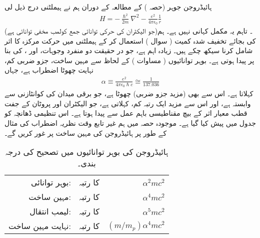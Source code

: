ہائیڈروجن جوہر (حصہ ) کے مطالعہ کے دوران ہم نے ہیملٹنی درج ذیل لی 
\begin{align}\label{مساوات_غیر_مضطرب_بوہر_ہیملٹنی}
H = - \frac{\hslash^2}{2m} \nabla^2 - \frac{e^2}{4 \pi \epsilon_0} \frac{1}{r}
\end{align}
(جو الیکٹران کی حرکی توانائی جمع کولمب مخفی توانائی ہے)۔ تاہم یہ مکمل کہانی نہیں ہے۔ ہم  کی بجائے تخفیف شدہ کمیت ( سوال ) استعمال کر کے ہیملٹنی میں حرکت مرکزہ کا اثر شامل کرنا سیکھ چکے ہیں۔ زیادہ اہم  ہے، جو در حقیقت دو منفرد وجوہات،  اور ، کی بنا پر پیدا ہوتی ہے۔ بوہر توانائیوں ( مساوات ) کے لحاظ سے مہین ساخت،  جزو ضربی کم، نہایت چھوٹا اضطراب ہے، جہاں 
\begin{align}
\alpha \equiv \frac{e^2}{4 \pi \epsilon_0 \hslash c} \cong \frac{1}{137.036}
\end{align} 
 کہلاتا ہے۔ اس سے بھی (مزید  جزو ضربی) چھوٹا  ہے، جو برقی میدان کی کوانٹازنی سے وابستہ ہے، اور اس سے مزید ایک رتبہ کم،  کہلاتی ہے، جو الیکٹران اور پروٹان کے جفت قطب معیار اثر کے بیچ مقناطیسی باہم عمل سے پیدا ہوتا ہے۔ اس تنظیمی ڈھانچہ کو جدول  میں پیش کیا گیا ہے۔ موجودہ حصہ میں ہم غیر تابع وقت نظریہ اضطراب کی مثال کے طور پر ہائیڈروجن کی مہین ساخت پر غور کریں گے۔
\begin{table}
\caption{ہائیڈروجن کی بوہر توانائیوں میں تصحیح کی درجہ بندی۔}
\label{جدول_غیر_مضطرب_توانائی_تصحیح_درجہ_بندی}
\centering
\begin{tabular}{rrr}
بوہر توانائی:& کا رتبہ&$\alpha^2mc^2$\\
مہین ساخت:& کا رتبہ& $\alpha^4mc^2$\\
لیمب انتقال:&کا رتبہ&$\alpha^5mc^2$\\
نہایت مہین ساخت:&کا رتبہ&$(m/m_p)\alpha^4mc^2$
\end{tabular}
\end{table}
